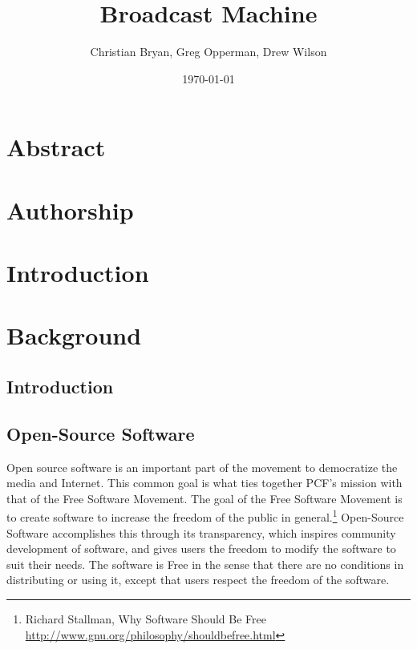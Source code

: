 \documentclass[a4paper,12pt]{report}
\author{Christian Bryan, Greg Opperman, Drew Wilson}
\date{\today}
\title{Broadcast Machine}
\begin{document}
\maketitle


\chapter*{Abstract}

\chapter*{Authorship}

\tableofcontents

\chapter{Introduction}

\chapter{Background}

\section{Introduction}

\section{Open-Source Software}
Open source software is an important part of the movement to democratize the media and Internet. 
This common goal is what ties together PCF's mission with that of the Free Software Movement. 
The goal of the Free Software Movement is to create software to increase the freedom of the public in general.\footnote{Richard Stallman, Why Software Should Be Free \url{http://www.gnu.org/philosophy/shouldbefree.html}}
Open-Source Software accomplishes this through its transparency, which inspires community development of software, and gives users the freedom to modify the software to suit their needs.
The software is Free in the sense that there are no conditions in distributing or using it, except that users respect the freedom of the software.
\end{document}
